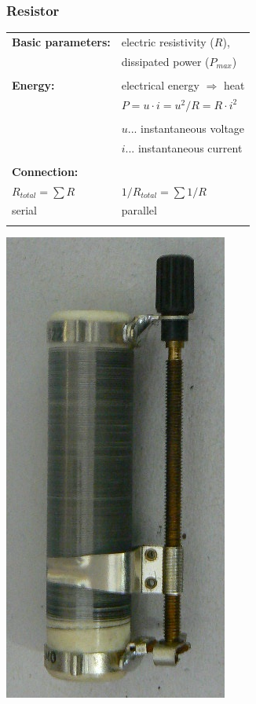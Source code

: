 \documentclass{beamer}
\begin{document}
	\begin{frame}
    \frametitle{Resistor}
		\begin{center}
		\begin{tabular}{l l}
			\textbf{Basic parameters:} 	& electric resistivity ($R$),\\
																	& dissipated power ($P_{max}$)\\ \\ \hline
			\textbf{Energy:}						& electrical energy $\Rightarrow$ heat\\
																	& $P = u\cdot i = u^2/ R = R\cdot i^2$\\\\
																	& $u$... instantaneous voltage\\
																	& $i$... instantaneous current\\\\ \hline
		  \textbf{Connection:}				& \\
			$R_{total}= \sum{R}$				& $1/R_{total}= \sum{1/R}$\\
			serial											& parallel\\\\
		\end{tabular}
		\includegraphics[scale=0.2]{obr02_potenciometr.png}
		\end{center}
  \end{frame}
	
\end{document}
